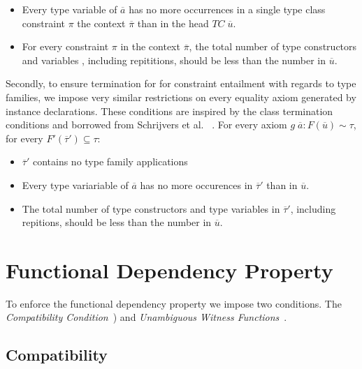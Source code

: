 \begin{itemize}
    \item Every type variable of $\overline{a}$ has no more occurrences in a
    single type class constraint $\pi$ the context $\overline{\pi}$ than in the
    head $TC \; \overline{u}$.

    \item For every constraint $\pi$ in the context $\overline{\pi}$, the total
    number of type constructors and variables , including repititions, should be
    less than the number in $\overline{u}$.
\end{itemize}

Secondly, to ensure termination for for constraint entailment with regards to
type families, we impose very similar restrictions on every equality axiom
generated by instance declarations. These conditions are inspired by the class
termination conditions and borrowed from Schrijvers et
al.~\cite{type-checking-with-open-type-functions} .
For every axiom $g \; \overline{a} : F(\overline{u}) \sim \tau$, for every
$F'(\overline{\tau}') \subseteq \tau$:
\begin{itemize}
    \item $\overline{\tau}'$ contains no type family applications

    \item Every type variariable of $\overline{a}$ has no more occurences in
    $\overline{\tau}'$ than in $\overline{u}$.

    \item The total number of type constructors and type variables in
    $\overline{\tau}'$, including repitions, should be less than the number in
    $\overline{u}$.
\end{itemize}

\section{Functional Dependency Property}

To enforce the functional dependency property we impose two conditions. The
\textit{Compatibility
Condition}~\cite[Def.~6.2]{Karachalias:2017:EFD:3156695.3122966}) and
\textit{Unambiguous Witness Functions}~\cite[Def
6.4]{Karachalias:2017:EFD:3156695.3122966}.

\subsection{Compatibility}

